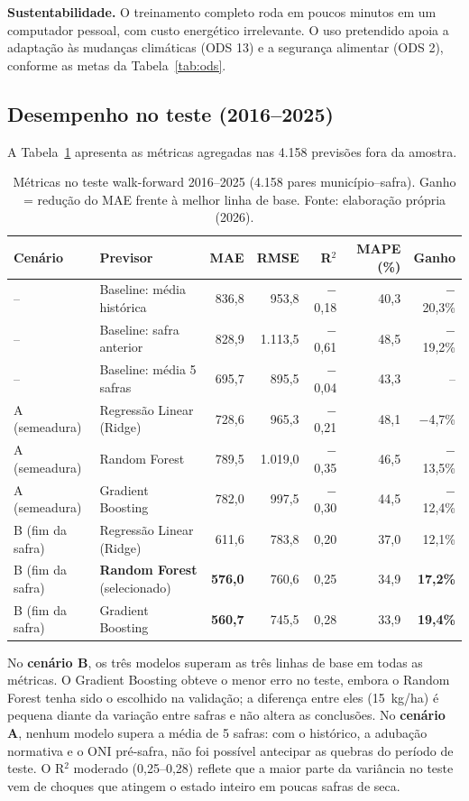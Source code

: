 \documentclass[12pt]{article}
\begin{document}
\textbf{Sustentabilidade.} O treinamento completo roda em poucos minutos em
um computador pessoal, com custo energético irrelevante. O uso pretendido
apoia a adaptação às mudanças climáticas (ODS 13) e a segurança alimentar
(ODS 2), conforme as metas da Tabela~\ref{tab:ods}.

\subsection{Desempenho no teste (2016--2025)}

A Tabela~\ref{tab:metricas} apresenta as métricas agregadas nas 4.158
previsões fora da amostra.

\begin{table}[ht]
\centering
\caption{Métricas no teste walk-forward 2016--2025 (4.158 pares município--safra).
  Ganho = redução do MAE frente à melhor linha de base. Fonte: elaboração própria (2026).}
\label{tab:metricas}
\footnotesize
\setlength{\tabcolsep}{4pt}
\begin{tabular}{|l|l|r|r|r|r|r|}
\hline
\textbf{Cenário} & \textbf{Previsor} & \textbf{MAE} & \textbf{RMSE} & \textbf{R$^2$} & \textbf{MAPE (\%)} & \textbf{Ganho} \\ \hline
-- & Baseline: média histórica & 836,8 & 953,8 & $-$0,18 & 40,3 & $-$20,3\% \\
-- & Baseline: safra anterior & 828,9 & 1.113,5 & $-$0,61 & 48,5 & $-$19,2\% \\
-- & Baseline: média 5 safras & 695,7 & 895,5 & $-$0,04 & 43,3 & -- \\ \hline
A (semeadura) & Regressão Linear (Ridge) & 728,6 & 965,3 & $-$0,21 & 48,1 & $-$4,7\% \\
A (semeadura) & Random Forest & 789,5 & 1.019,0 & $-$0,35 & 46,5 & $-$13,5\% \\
A (semeadura) & Gradient Boosting & 782,0 & 997,5 & $-$0,30 & 44,5 & $-$12,4\% \\ \hline
B (fim da safra) & Regressão Linear (Ridge) & 611,6 & 783,8 & 0,20 & 37,0 & 12,1\% \\
B (fim da safra) & \textbf{Random Forest} (selecionado) & \textbf{576,0} & 760,6 & 0,25 & 34,9 & \textbf{17,2\%} \\
B (fim da safra) & Gradient Boosting & \textbf{560,7} & 745,5 & 0,28 & 33,9 & \textbf{19,4\%} \\ \hline
\end{tabular}
\end{table}

No \textbf{cenário B}, os três modelos superam as três linhas de base em
todas as métricas. O Gradient Boosting obteve o menor erro no teste, embora
o Random Forest tenha sido o escolhido na validação; a diferença entre eles
(15~kg/ha) é pequena diante da variação entre safras e não altera as
conclusões. No \textbf{cenário A}, nenhum modelo supera a média de 5
safras: com o histórico, a adubação normativa e o ONI pré-safra, não foi
possível antecipar as quebras do período de teste. O R$^2$ moderado
(0,25--0,28) reflete que a maior parte da variância no teste vem de choques
que atingem o estado inteiro em poucas safras de seca.
\end{document}
